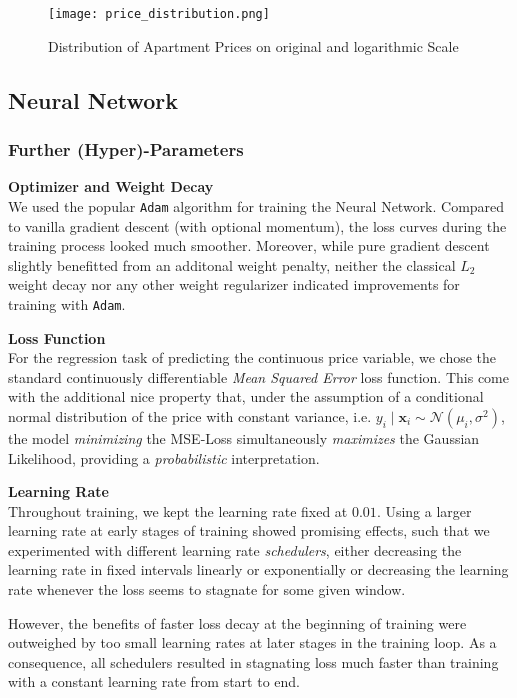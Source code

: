\begin{figure}[ht]
    \centering
    \texttt{[image: price\_distribution.png]}
    \caption{Distribution of Apartment Prices on original and logarithmic Scale}
    \label{fig:price-distribution}
\end{figure}


\subsection{Neural Network}

\subsubsection{Further (Hyper)-Parameters} \label{appendix:hyperparameters}

\textbf{Optimizer and Weight Decay} \\
We used the popular \texttt{Adam} algorithm \citep{kingma2017} for training the Neural Network.
Compared to vanilla gradient descent (with optional momentum), the loss curves during the training process looked much smoother.
Moreover, while pure gradient descent slightly benefitted from an additonal weight penalty, neither the classical $L_2$ weight decay nor any other weight regularizer indicated improvements for training with \texttt{Adam}.

\textbf{Loss Function} \\
For the regression task of predicting the continuous price variable, we chose the standard continuously differentiable \emph{Mean Squared Error} loss function.
This come with the additional nice property that, under the assumption of a conditional normal distribution of the price with constant variance, i.e. $y_i \mid \mathbf{x}_i \sim \mathcal{N} \left(\mu_i, \sigma^2 \right)$, the model \emph{minimizing} the MSE-Loss simultaneously \emph{maximizes} the Gaussian Likelihood, providing a \emph{probabilistic} interpretation.

\textbf{Learning Rate} \\
Throughout training, we kept the learning rate fixed at $0.01$.
Using a larger learning rate at early stages of training showed promising effects, such that we experimented with different learning rate \emph{schedulers}, either decreasing the learning rate in fixed intervals linearly or exponentially or decreasing the learning rate whenever the loss seems to stagnate for some given window.

However, the benefits of faster loss decay at the beginning of training were outweighed by too small learning rates at later stages in the training loop.
As a consequence, all schedulers resulted in stagnating loss much faster than training with a constant learning rate from start to end.

